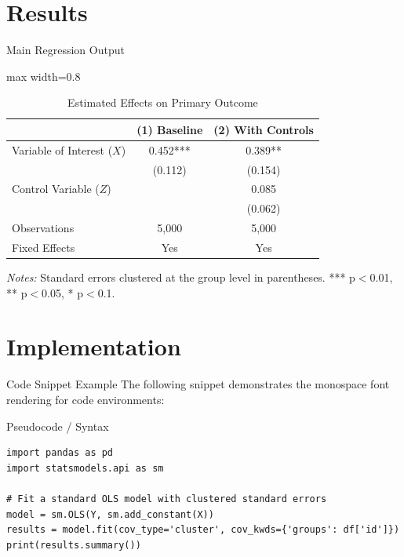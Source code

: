 \documentclass[10pt, aspectratio=169]{beamer}
\begin{document}
\section{Results}
\begin{frame}{Main Regression Output}
    \begin{table}
        \centering
        \caption{Estimated Effects on Primary Outcome}
        \begin{adjustbox}{max width=0.8\textwidth}
        \begin{tabular}{lcc}
            \toprule
            & (1) Baseline & (2) With Controls \\
            \midrule
            Variable of Interest ($X$) & 0.452*** & 0.389** \\
                                     & (0.112)  & (0.154) \\
            Control Variable ($Z$)     &          & 0.085 \\
                                     &          & (0.062) \\
            \midrule
            Observations               & 5,000    & 5,000   \\
            Fixed Effects              & Yes      & Yes     \\
            \bottomrule
        \end{tabular}
        \end{adjustbox}
        
        \begin{tablenotes}
            \footnotesize
            \textit{Notes:} Standard errors clustered at the group level in parentheses. *** p$<$0.01, ** p$<$0.05, * p$<$0.1.
        \end{tablenotes}
    \end{table}
\end{frame}

\section{Implementation}
\begin{frame}[fragile]{Code Snippet Example}
    The following snippet demonstrates the monospace font rendering for code environments:
    
    \vspace{1em}
    \begin{block}{Pseudocode / Syntax}
\begin{verbatim}
import pandas as pd
import statsmodels.api as sm

# Fit a standard OLS model with clustered standard errors
model = sm.OLS(Y, sm.add_constant(X))
results = model.fit(cov_type='cluster', cov_kwds={'groups': df['id']})
print(results.summary())
\end{verbatim}
    \end{block}
\end{frame}
\end{document}
